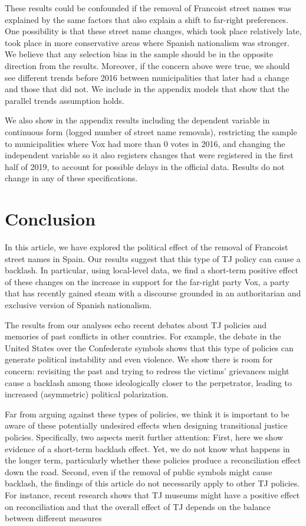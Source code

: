 \documentclass[12pt, notitlepage]{article}
\begin{document}
These results could be confounded if the removal of Francoist street names was explained by the same factors that also explain a shift to far-right preferences.
One possibility is that these street name changes, which took place relatively late, took place in more conservative areas where Spanish nationalism was stronger.
We believe that any selection bias in the sample should be in the opposite direction from the results.
Moreover, if the concern above were true, we should see different trends before 2016 between municipalities that later had a change and those that did not.
We include in the appendix models that show that the parallel trends assumption holds.

We also show in the appendix results including the dependent variable in continuous form (logged number of street name removals), restricting the sample to municipalities where Vox had more than 0 votes in 2016, and changing the independent variable so it also registers changes that were registered in the first half of 2019, to account for possible delays in the official data.
Results do not change in any of these specifications.

\section*{Conclusion}

In this article, we have explored the political effect of the removal of Francoist street names in Spain.
Our results suggest that this type of TJ policy can cause a backlash.
In particular, using local-level data, we find a short-term positive effect of these changes on the increase in support for the far-right party Vox, a party that has recently gained steam with a discourse grounded in an authoritarian and exclusive version of Spanish nationalism.

The results from our analyses echo recent debates about TJ policies and memories of past conflicts in other countries. For example, the debate in the United States over the Confederate symbols shows that this type of policies can generate political instability and even violence. We show there is room for concern: revisiting the past and trying to redress the victims' grievances might cause a backlash among those ideologically closer to the perpetrator, leading to increased (asymmetric) political polarization.

Far from arguing against these types of policies, we think it is important to be aware of these potentially undesired effects when designing transitional justice policies. Specifically, two aspects merit further attention:
First, here we show evidence of a short-term backlash effect. Yet, we do not know what happens in the longer term, particularly whether these policies produce a reconciliation effect down the road. Second, even if the removal of public symbols might cause backlash, the findings of this article do not necessarily apply to other TJ policies. For instance, recent research shows that TJ museums might have a positive effect on reconciliation \citep{Balcells:2020aa} and that the overall effect of TJ depends on the balance between different measures \citep{Olsen:2010aa, Loyle:2017aa}
\end{document}
